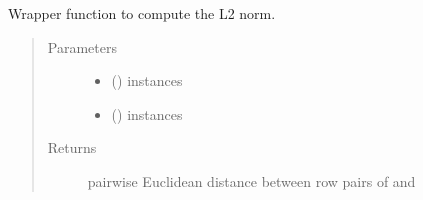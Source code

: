\documentclass[letterpaper,10pt,english]{sphinxmanual}
\begin{document}
\begin{fulllineitems}
\label{\detokenize{index:bo.covfunc.l2_norm}}
Wrapper function to compute the L2 norm.
\begin{quote}\begin{description}
\item[{Parameters}] \leavevmode\begin{itemize}
\item {} 
 (\sphinxstyleliteralemphasis{, }\sphinxstyleliteralemphasis{(}\sphinxstyleliteralemphasis{(}\sphinxstyleliteralemphasis{, }\sphinxstyleliteralemphasis{)}\sphinxstyleliteralemphasis{)}) \textendash{} instances

\item {} 
 (\sphinxstyleliteralemphasis{, }\sphinxstyleliteralemphasis{(}\sphinxstyleliteralemphasis{(}\sphinxstyleliteralemphasis{, }\sphinxstyleliteralemphasis{)}\sphinxstyleliteralemphasis{)}) \textendash{} instances

\end{itemize}

\item[{Returns}] \leavevmode
pairwise Euclidean distance between row pairs of  and 

\end{description}\end{quote}

\end{fulllineitems}

\label{\detokenize{index:module-bo.logger}}
\end{document}
